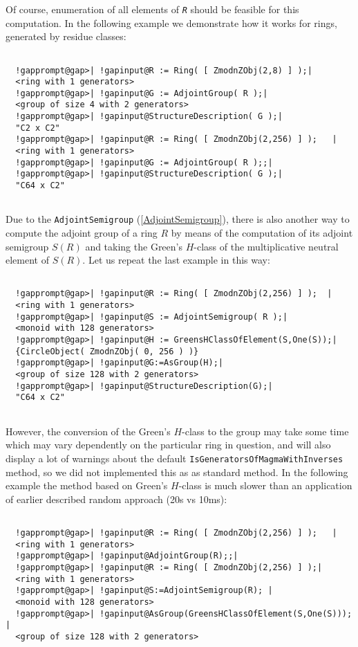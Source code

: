 \documentclass[a4paper,11pt]{report}
\begin{document}
{{{ Of course, enumeration of all elements of \mbox{\texttt{\mdseries\slshape R}} should be feasible for this computation. In the following example we
demonstrate how it works for rings, generated by residue classes: 
\begin{Verbatim}[commandchars=!@|,fontsize=\small,frame=single,label=Example]
  
  !gapprompt@gap>| !gapinput@R := Ring( [ ZmodnZObj(2,8) ] );|
  <ring with 1 generators>
  !gapprompt@gap>| !gapinput@G := AdjointGroup( R );|
  <group of size 4 with 2 generators>
  !gapprompt@gap>| !gapinput@StructureDescription( G );|
  "C2 x C2"
  !gapprompt@gap>| !gapinput@R := Ring( [ ZmodnZObj(2,256) ] );   |
  <ring with 1 generators>
  !gapprompt@gap>| !gapinput@G := AdjointGroup( R );;|
  !gapprompt@gap>| !gapinput@StructureDescription( G );|
  "C64 x C2"
  
\end{Verbatim}
 Due to the \texttt{AdjointSemigroup} (\ref{AdjointSemigroup}), there is also another way to compute the adjoint group of a ring $R$ by means of the computation of its adjoint semigroup $S(R)$ and taking the Green's $H$-class of the multiplicative neutral element of $S(R)$. Let us repeat the last example in this way: 
\begin{Verbatim}[commandchars=!@|,fontsize=\small,frame=single,label=Example]
  
  !gapprompt@gap>| !gapinput@R := Ring( [ ZmodnZObj(2,256) ] );  |
  <ring with 1 generators>
  !gapprompt@gap>| !gapinput@S := AdjointSemigroup( R );|
  <monoid with 128 generators>
  !gapprompt@gap>| !gapinput@H := GreensHClassOfElement(S,One(S));|
  {CircleObject( ZmodnZObj( 0, 256 ) )}
  !gapprompt@gap>| !gapinput@G:=AsGroup(H);|
  <group of size 128 with 2 generators>
  !gapprompt@gap>| !gapinput@StructureDescription(G);|
  "C64 x C2"
  
\end{Verbatim}
 However, the conversion of the Green's $H$-class to the group may take some time which may vary dependently on the
particular ring in question, and will also display a lot of warnings about the
default \texttt{IsGeneratorsOfMagmaWithInverses} method, so we did not implemented this as as standard method. In the following
example the method based on Green's $H$-class is much slower than an application of earlier described random approach
(20s vs 10ms): 
\begin{Verbatim}[commandchars=!@|,fontsize=\small,frame=single,label=Example]
  
  !gapprompt@gap>| !gapinput@R := Ring( [ ZmodnZObj(2,256) ] );   |
  <ring with 1 generators>
  !gapprompt@gap>| !gapinput@AdjointGroup(R);;|
  !gapprompt@gap>| !gapinput@R := Ring( [ ZmodnZObj(2,256) ] );|
  <ring with 1 generators>
  !gapprompt@gap>| !gapinput@S:=AdjointSemigroup(R); |
  <monoid with 128 generators>
  !gapprompt@gap>| !gapinput@AsGroup(GreensHClassOfElement(S,One(S))); |
  <group of size 128 with 2 generators>
  

\end{Verbatim}}}}
\end{document}
